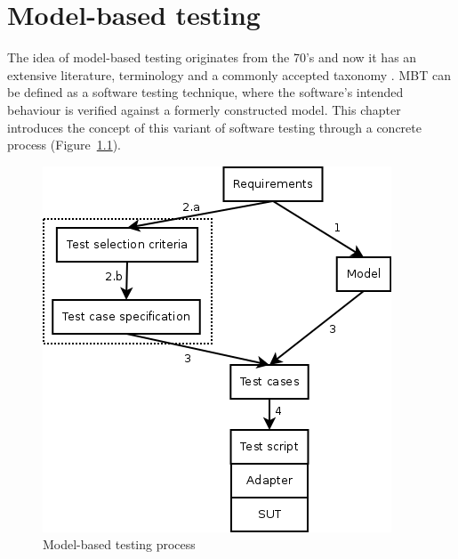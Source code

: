 \chapter{Model-based testing}
\label{cha:modelbasedtesting}

The idea of model-based testing originates from the 70's and now it has an extensive literature, terminology and a commonly accepted taxonomy \cite{taxonomy}. MBT can be defined as a software testing technique, where the software's intended behaviour is verified against a formerly constructed model. This chapter introduces the concept of this variant of software testing through a concrete process (Figure~\ref{fig:mbtprocess}).

\begin{figure}[htp]
\centering
\includegraphics[scale=0.55]{figures/mbt_process.png}
\caption{Model-based testing process}
\label{fig:mbtprocess}
\end{figure}

